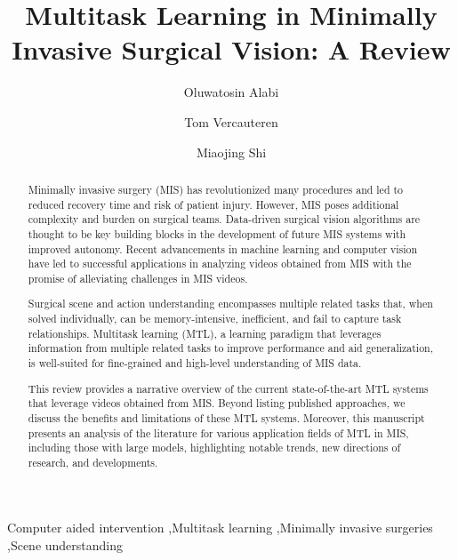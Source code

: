 \documentclass[times,twocolumn,final]{elsarticle}
\begin{document}

\begin{frontmatter}

\title{Multitask Learning in Minimally Invasive Surgical Vision: A Review}

\author[1]{Oluwatosin {Alabi}}
\author[1]{Tom {Vercauteren}}
\author[2,3]{Miaojing {Shi}}


\address[1]{School of Biomedical Engineering \& Imaging Sciences, King's College London}
\address[2]{College of Electronic and Information Engineering, Tongji University}
 \address[3]{Shanghai Institute of Intelligent Science and Technology, Tongji University}

\received{}
\finalform{}
\accepted{}
\availableonline{}
\communicated{}


\begin{abstract}
Minimally invasive surgery (MIS) has revolutionized many procedures and led to reduced recovery time and risk of patient injury. However, MIS poses additional complexity and burden on surgical teams. Data-driven surgical vision algorithms are thought to be key building blocks in the development of future MIS systems
with improved autonomy.
Recent advancements in machine learning and computer vision have led to successful applications in analyzing videos obtained from MIS with the promise of alleviating challenges in MIS videos.


Surgical scene and action understanding
encompasses multiple related tasks that, when solved individually, can be memory-intensive, inefficient, and fail to capture task relationships. Multitask learning (MTL), a learning paradigm that leverages information from multiple related tasks to improve performance and aid generalization, is well-suited for
fine-grained and high-level understanding of MIS data.

This review provides a narrative overview of the current state-of-the-art MTL systems that leverage videos obtained from MIS.
Beyond listing published approaches, we discuss the benefits and limitations of these MTL systems. Moreover, this manuscript presents an analysis of the literature for various application fields of MTL in MIS, including those with large models, highlighting notable trends, new directions of research, and developments. 

\end{abstract}
\begin{keyword}
\KWD Computer aided intervention \sep Multitask learning \sep Minimally invasive surgeries \sep Scene understanding
\end{keyword}


\end{frontmatter}
\fi
\end{document}
